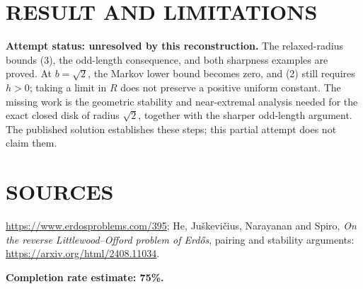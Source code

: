 \section{RESULT AND LIMITATIONS}
\textbf{Attempt status: unresolved by this reconstruction.} The relaxed-radius bounds (3), the odd-length consequence, and both sharpness examples are proved. At $b=\sqrt2$, the Markov lower bound becomes zero, and (2) still requires $h>0$; taking a limit in $R$ does not preserve a positive uniform constant. The missing work is the geometric stability and near-extremal analysis needed for the exact closed disk of radius $\sqrt2$, together with the sharper odd-length argument. The published solution establishes these steps; this partial attempt does not claim them.

\section{SOURCES}
\url{https://www.erdosproblems.com/395}; He, Ju\v skevi\v cius, Narayanan and Spiro, \emph{On the reverse Littlewood--Offord problem of Erd\H{o}s}, pairing and stability arguments: \url{https://arxiv.org/html/2408.11034}.

\textbf{Completion rate estimate: 75\%.}
